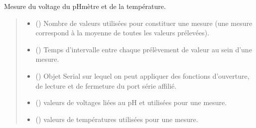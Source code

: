 \documentclass[letterpaper,10pt,french]{sphinxmanual}
\begin{document}

\begin{fulllineitems}
\label{\detokenize{library:lib_pH.pH_sensor}}
\pysigstartsignatures
\pysiglinewithargsret
{}
{\sphinxparamcomma {}\sphinxparamcomma {}}
{}
\pysigstopsignatures
\sphinxAtStartPar
Mesure du voltage du pH\sphinxhyphen{}mètre et de la température.
\begin{quote}\begin{description}
\begin{itemize}
\item {} 
\sphinxAtStartPar
{} () \textendash{} Nombre de valeurs utilisées pour constituer une mesure (une mesure correspond à la moyenne de toutes les valeurs prélevées).

\item {} 
\sphinxAtStartPar
{} () \textendash{} Temps d’intervalle entre chaque prélèvement de valeur au sein d’une mesure.

\item {} 
\sphinxAtStartPar
{} () \textendash{} Objet Serial sur lequel on peut appliquer des fonctions d’ouverture, de lecture et de fermeture du port série affilié.

\end{itemize}

\sphinxAtStartPar
\begin{itemize}
\item {} 
\sphinxAtStartPar
{} () \textendash{} valeurs de voltages liées au pH et utilisées pour une mesure.

\item {} 
\sphinxAtStartPar
{} () \textendash{} valeurs de températures utilisées pour une mesure.

\end{itemize}


\end{description}\end{quote}

\end{fulllineitems}
\end{document}
